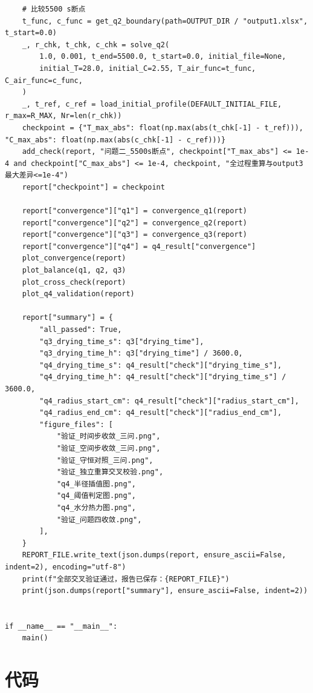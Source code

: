 \documentclass[withoutpreface,bwprint]{cumcm_thesis}
\begin{document}
\begin{appendices}
\begin{lstlisting}
    # 比较5500 s断点
    t_func, c_func = get_q2_boundary(path=OUTPUT_DIR / "output1.xlsx", t_start=0.0)
    _, r_chk, t_chk, c_chk = solve_q2(
        1.0, 0.001, t_end=5500.0, t_start=0.0, initial_file=None,
        initial_T=28.0, initial_C=2.55, T_air_func=t_func, C_air_func=c_func,
    )
    _, t_ref, c_ref = load_initial_profile(DEFAULT_INITIAL_FILE, r_max=R_MAX, Nr=len(r_chk))
    checkpoint = {"T_max_abs": float(np.max(abs(t_chk[-1] - t_ref))), "C_max_abs": float(np.max(abs(c_chk[-1] - c_ref)))}
    add_check(report, "问题二_5500s断点", checkpoint["T_max_abs"] <= 1e-4 and checkpoint["C_max_abs"] <= 1e-4, checkpoint, "全过程重算与output3最大差异<=1e-4")
    report["checkpoint"] = checkpoint

    report["convergence"]["q1"] = convergence_q1(report)
    report["convergence"]["q2"] = convergence_q2(report)
    report["convergence"]["q3"] = convergence_q3(report)
    report["convergence"]["q4"] = q4_result["convergence"]
    plot_convergence(report)
    plot_balance(q1, q2, q3)
    plot_cross_check(report)
    plot_q4_validation(report)

    report["summary"] = {
        "all_passed": True,
        "q3_drying_time_s": q3["drying_time"],
        "q3_drying_time_h": q3["drying_time"] / 3600.0,
        "q4_drying_time_s": q4_result["check"]["drying_time_s"],
        "q4_drying_time_h": q4_result["check"]["drying_time_s"] / 3600.0,
        "q4_radius_start_cm": q4_result["check"]["radius_start_cm"],
        "q4_radius_end_cm": q4_result["check"]["radius_end_cm"],
        "figure_files": [
            "验证_时间步收敛_三问.png",
            "验证_空间步收敛_三问.png",
            "验证_守恒对照_三问.png",
            "验证_独立重算交叉校验.png",
            "q4_半径插值图.png",
            "q4_阈值判定图.png",
            "q4_水分热力图.png",
            "验证_问题四收敛.png",
        ],
    }
    REPORT_FILE.write_text(json.dumps(report, ensure_ascii=False, indent=2), encoding="utf-8")
    print(f"全部交叉验证通过，报告已保存：{REPORT_FILE}")
    print(json.dumps(report["summary"], ensure_ascii=False, indent=2))


if __name__ == "__main__":
    main()

\end{lstlisting}

\fi

\section{代码}
\begingroup
{}


\end{appendices}
\end{document}
